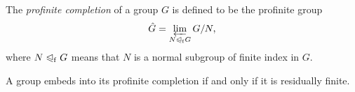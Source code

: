 \documentclass[12pt]{article}
\newcommand{\nsgpf}{\trianglelefteqslant_{\mathrm{f}}}
\begin{document}
The \emph{profinite completion} of a group $G$
is defined to be the profinite group
\[
  \hat{G} = \varprojlim_{N \nsgpf G} G/N,
\]
where $N \nsgpf G$ means that $N$ is a normal subgroup of finite index in $G$.

A group embeds into its profinite completion
if and only if it is residually finite.
\end{document}
